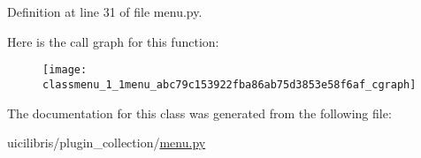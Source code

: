 \-Definition at line 31 of file menu.\-py.



\-Here is the call graph for this function\-:
\nopagebreak
\begin{figure}[H]
\begin{center}
\leavevmode
\texttt{[image: classmenu\_1\_1menu\_abc79c153922fba86ab75d3853e58f6af\_cgraph]}
\end{center}
\end{figure}




\-The documentation for this class was generated from the following file\-:\begin{DoxyCompactItemize}
\item 
uicilibris/plugin\-\_\-collection/\hyperlink{menu_8py}{menu.\-py}\end{DoxyCompactItemize}
